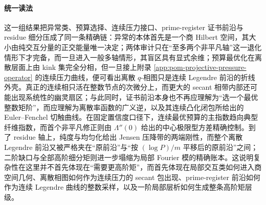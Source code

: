 \paragraph{统一读法}
这一组结果把异常类、预算选择、连续压力接口、prime-register 证书前沿与 residue 细分压成了同一条精确链：异常的本体首先是一个商 Hilbert 空间，其大小由纯交互分量的正交能量唯一决定；两体审计只在“至多两个非平凡轴”这一退化情形下才完备，而一旦进入一般多轴情形，其盲区具有显式余维；预算最优化在离散层面上由 kink 集完全分相，但一旦接上附录 \ref{app:pom-projective-pressure-operator} 的连续压力曲线，便可看出离散 \(q\)-相图只是连续 Legendre 前沿的折线外壳。真正的连续相只活在整数节点的次微分上，而更大的 secant 相带内部还可能出现系统性的幽灵扇区；与此同时，证书前沿本身也不再应理解为“选一个最优整数矩阶”，而应理解为离散率函数的广义逆，以及其连续凸化闭包所给出的 Euler--Fenchel 切触曲线。在固定置信度口径下，连续最优预算的主指数趋向典型纤维指数，而首个非平凡修正则由 \(\Lambda''(0)\) 给出的中心极限型方差精确控制。到了 residue 轴上，纯度与均匀化给出 Jensen 压降带的两端刚性，而整个离散 Legendre 前沿又被严格夹在“原前沿”与“按 \((\log P)/m\) 平移后的原前沿”之间；二阶缺口与全部高阶细分矩则进一步塌缩为局部 Fourier 模的精确账本。这说明复杂性在这里并不首先体现在“需要更高阶矩”，而首先体现在局部交互类如何进入商空间几何、离散相图如何作为连续压力的 secant 包出现、prime-register 前沿如何作为连续 Legendre 曲线的整数采样，以及一阶局部层析如何生成整条高阶矩层级。

\endinput
